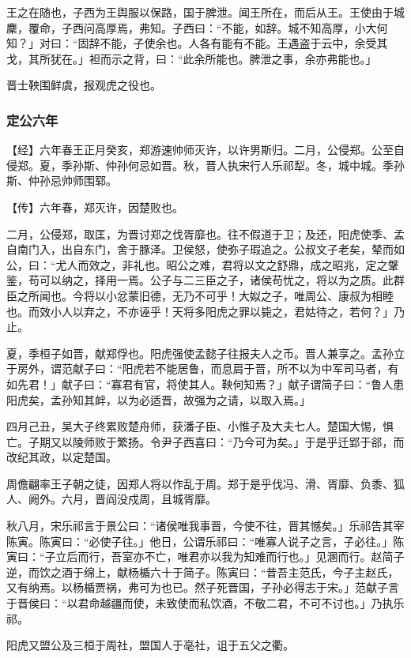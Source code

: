 \documentclass[]{article}
\begin{document}
王之在随也，子西为王舆服以保路，国于脾泄。闻王所在，而后从王。王使由于城麇，覆命，子西问高厚焉，弗知。子西曰：``不能，如辞。城不知高厚，小大何知？」对曰：``固辞不能，子使余也。人各有能有不能。王遇盗于云中，余受其戈，其所犹在。」袒而示之背，曰：``此余所能也。脾泄之事，余亦弗能也。」

晋士鞅围鲜虞，报观虎之役也。

\hypertarget{header-n2933}{%
\subsubsection{定公六年}\label{header-n2933}}

【经】六年春王正月癸亥，郑游速帅师灭许，以许男斯归。二月，公侵郑。公至自侵郑。夏，季孙斯、仲孙何忌如晋。秋，晋人执宋行人乐祁犁。冬，城中城。季孙斯、仲孙忌帅师围郓。

【传】六年春，郑灭许，因楚败也。

二月，公侵郑，取匡，为晋讨郑之伐胥靡也。往不假道于卫；及还，阳虎使季、孟自南门入，出自东门，舍于豚泽。卫侯怒，使弥子瑕追之。公叔文子老矣，辇而如公，曰：``尤人而效之，非礼也。昭公之难，君将以文之舒鼎，成之昭兆，定之鞶鉴，苟可以纳之，择用一焉。公子与二三臣之子，诸侯苟忧之，将以为之质。此群臣之所闻也。今将以小忿蒙旧德，无乃不可乎！大姒之子，唯周公、康叔为相睦也。而效小人以弃之，不亦诬乎！天将多阳虎之罪以毙之，君姑待之，若何？」乃止。

夏，季桓子如晋，献郑俘也。阳虎强使孟懿子往报夫人之币。晋人兼享之。孟孙立于房外，谓范献子曰：``阳虎若不能居鲁，而息肩于晋，所不以为中军司马者，有如先君！」献子曰：``寡君有官，将使其人。鞅何知焉？」献子谓简子曰：``鲁人患阳虎矣，孟孙知其衅，以为必适晋，故强为之请，以取入焉。」

四月己丑，吴大子终累败楚舟师，获潘子臣、小惟子及大夫七人。楚国大惕，惧亡。子期又以陵师败于繁扬。令尹子西喜曰：``乃今可为矣。」于是乎迁郢于郤，而改纪其政，以定楚国。

周儋翩率王子朝之徒，因郑人将以作乱于周。郑于是乎伐冯、滑、胥靡、负黍、狐人、阙外。六月，晋阎没戍周，且城胥靡。

秋八月，宋乐祁言于景公曰：``诸侯唯我事晋，今使不往，晋其憾矣。」乐祁告其宰陈寅。陈寅曰：``必使子往。」他日，公谓乐祁曰：``唯寡人说子之言，子必往。」陈寅曰：``子立后而行，吾室亦不亡，唯君亦以我为知难而行也。」见溷而行。赵简子逆，而饮之酒于绵上，献杨楯六十于简子。陈寅曰：``昔吾主范氏，今子主赵氏，又有纳焉。以杨楯贾祸，弗可为也已。然子死晋国，子孙必得志于宋。」范献子言于晋侯曰：``以君命越疆而使，未致使而私饮酒，不敬二君，不可不讨也。」乃执乐祁。

阳虎又盟公及三桓于周社，盟国人于亳社，诅于五父之衢。
\end{document}
